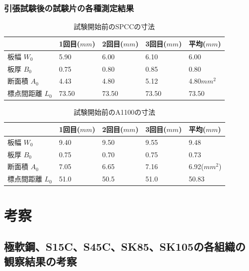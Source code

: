 \documentclass[10pt,a4j]{jsarticle}
\begin{document}
  \subsubsection{引張試験後の試験片の各種測定結果}
    \begin{table}[H]
      \centering
      \caption{試験開始前のSPCCの寸法}
      \label{my-label}
        \footnotesize
        \begin{tabular}{lllll}
                      & 1回目($mm$) & 2回目($mm$) & 3回目($mm$) & 平均($mm$) \\ \hline
        板幅 $W_{0}$    & 5.90   & 6.00   & 6.10   & 6.00  \\
        板厚 $B_{0}$    & 0.75   & 0.80   & 0.85   & 0.80   \\
        断面積 $A_{0}$   & 4.43   & 4.80   & 5.12   & 4.80$mm^{2}$  \\
        標点間距離 $L_{0}$ & 73.50    & 73.50    & 73.50    & 73.50 
      \end{tabular}
    \end{table}
    \begin{table}[H]
      \centering
      \caption{試験開始前のA1100の寸法}
      \label{my-label}
        \footnotesize
        \begin{tabular}{lllll}
                      & 1回目($mm$) & 2回目($mm$) & 3回目($mm$) & 平均($mm$) \\ \hline
        板幅 $W_{0}$    & 9.40   & 9.50   & 9.55   & 9.48  \\
        板厚 $B_{0}$    & 0.75   & 0.70   & 0.75   & 0.73   \\
        断面積 $A_{0}$   & 7.05   & 6.65   & 7.16   & 6.92($mm^{2}$)  \\
        標点間距離 $L_{0}$ & 51.0    & 50.5    & 51.0    & 50.83 
      \end{tabular}
    \end{table}


\section{考察}
  \subsection{極軟鋼、S15C、S45C、SK85、SK105の各組織の観察結果の考察}
\end{document}
